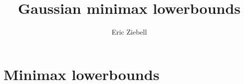 \documentclass{book}
\author{Eric Ziebell}
\title{Gaussian minimax lowerbounds}
\begin{document}
\maketitle

\chapter{Minimax lowerbounds}




  
\end{document}
